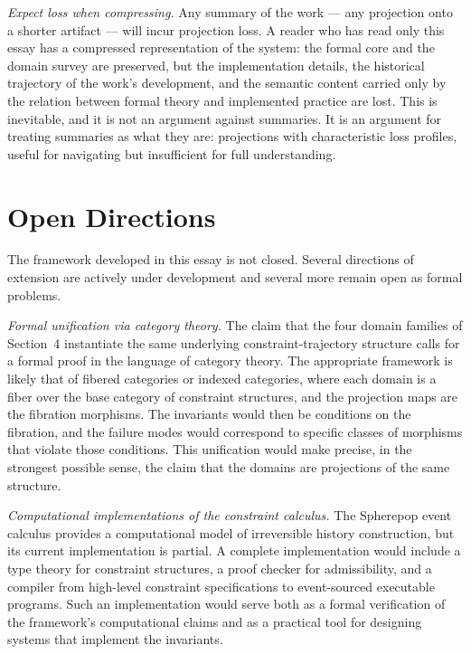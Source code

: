 \documentclass[12pt, twoside]{article}
\theoremstyle{plain}
\theoremstyle{definition}
\theoremstyle{remark}
\begin{document}
\textit{Expect loss when compressing.}
Any summary of the work — any projection onto a shorter artifact —
will incur projection loss.
A reader who has read only this essay has a compressed representation
of the system: the formal core and the domain survey are preserved,
but the implementation details, the historical trajectory of
the work's development, and the semantic content carried only
by the relation between formal theory and implemented practice
are lost.
This is inevitable, and it is not an argument against summaries.
It is an argument for treating summaries as what they are:
projections with characteristic loss profiles, useful for
navigating but insufficient for full understanding.

\newpage

\section{Open Directions}

The framework developed in this essay is not closed.
Several directions of extension are actively under development
and several more remain open as formal problems.

\textit{Formal unification via category theory.}
The claim that the four domain families of Section~4 instantiate the
same underlying constraint-trajectory structure calls for a formal
proof in the language of category theory.
The appropriate framework is likely that of fibered categories
or indexed categories, where each domain is a fiber over
the base category of constraint structures, and the projection maps
are the fibration morphisms.
The invariants would then be conditions on the fibration,
and the failure modes would correspond to specific classes of
morphisms that violate those conditions.
This unification would make precise, in the strongest possible sense,
the claim that the domains are projections of the same structure.

\textit{Computational implementations of the constraint calculus.}
The Spherepop event calculus provides a computational model
of irreversible history construction, but its current implementation
is partial.
A complete implementation would include a type theory for
constraint structures, a proof checker for admissibility,
and a compiler from high-level constraint specifications
to event-sourced executable programs.
Such an implementation would serve both as a formal verification
of the framework's computational claims and as a practical tool
for designing systems that implement the invariants.
\end{document}
